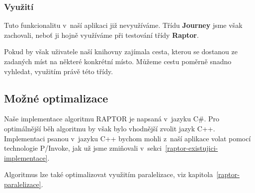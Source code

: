 \subsubsection{Využití}

Tuto funkcionalitu v~naší aplikaci již nevyužíváme. Třídu \textbf{Journey} jsme však zachovali, neboť ji hojně využíváme při testování třídy \textbf{Raptor}.

Pokud by však uživatele naší knihovny zajímala cesta, kterou se dostanou ze zadaných míst na některé konkrétní místo. Můžeme cestu poměrně snadno vyhledat, využitím právě této třídy.

\subsection{Možné optimalizace}

Naše implementace algoritmu RAPTOR je napsaná v~jazyku C\#. Pro optimálnější běh algoritmu by však bylo vhodnější zvolit jazyk C++. Implementaci psanou v~jazyku C++ bychom mohli z~naší aplikace volat pomocí technologie P/Invoke, jak už jsme zmiňovali v~sekci~\ref{raptor-existujici-implementace}.

Algoritmus lze také optimalizovat využitím paralelizace, viz kapitola~\ref{raptor-paralelizace}.
